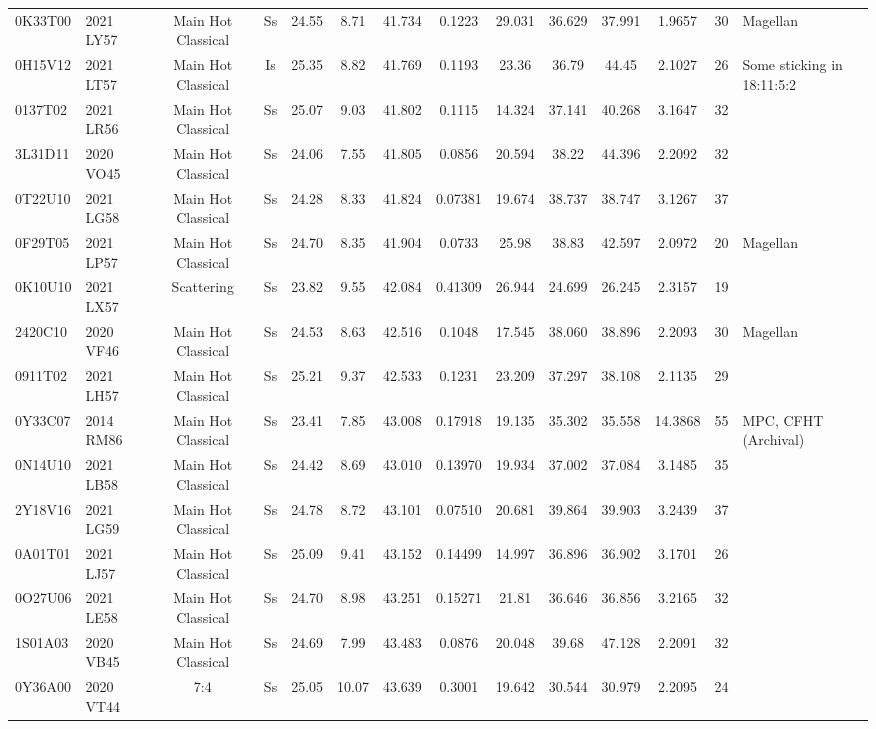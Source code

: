 \begin{longrotatetable}
\begin{longtable}{ll|ccccccccccc | l}
0K33T00 & 2021 LY57 & Main Hot Classical & Ss & 24.55 & 8.71 & 41.734 & 0.1223 & 29.031 & 36.629 & 37.991 & 1.9657 & 30 & Magellan  \\ 
0H15V12 & 2021 LT57 & Main Hot Classical & Is & 25.35 & 8.82 & 41.769 & 0.1193 & 23.36 & 36.79 & 44.45 & 2.1027 & 26 & Some sticking in 18:11:5:2  \\ 
0137T02 & 2021 LR56 & Main Hot Classical & Ss & 25.07 & 9.03 & 41.802 & 0.1115 & 14.324 & 37.141 & 40.268 & 3.1647 & 32 & \\ 
3L31D11 & 2020 VO45 & Main Hot Classical & Ss & 24.06 & 7.55 & 41.805 & 0.0856 & 20.594 & 38.22 & 44.396 & 2.2092 & 32 & \\ 
0T22U10 & 2021 LG58 & Main Hot Classical & Ss & 24.28 & 8.33 & 41.824 & 0.07381 & 19.674 & 38.737 & 38.747 & 3.1267 & 37 & \\ 
0F29T05 & 2021 LP57 & Main Hot Classical & Ss & 24.70 & 8.35 & 41.904 & 0.0733 & 25.98 & 38.83 & 42.597 & 2.0972 & 20 & Magellan  \\ 
0K10U10 & 2021 LX57 & Scattering & Ss & 23.82 & 9.55 & 42.084 & 0.41309 & 26.944 & 24.699 & 26.245 & 2.3157 & 19 & \\ 
2420C10 & 2020 VF46 & Main Hot Classical & Ss & 24.53 & 8.63 & 42.516 & 0.1048 & 17.545 & 38.060 & 38.896 & 2.2093 & 30 & Magellan  \\ 
0911T02 & 2021 LH57 & Main Hot Classical & Ss & 25.21 & 9.37 & 42.533 & 0.1231 & 23.209 & 37.297 & 38.108 & 2.1135 & 29 & \\ 
0Y33C07 & 2014 RM86 & Main Hot Classical & Ss & 23.41 & 7.85 & 43.008 & 0.17918 & 19.135 & 35.302 & 35.558 & 14.3868 & 55 & MPC, CFHT (Archival)  \\ 
0N14U10 & 2021 LB58 & Main Hot Classical & Ss & 24.42 & 8.69 & 43.010 & 0.13970 & 19.934 & 37.002 & 37.084 & 3.1485 & 35 & \\ 
2Y18V16 & 2021 LG59 & Main Hot Classical & Ss & 24.78 & 8.72 & 43.101 & 0.07510 & 20.681 & 39.864 & 39.903 & 3.2439 & 37 & \\ 
0A01T01 & 2021 LJ57 & Main Hot Classical & Ss & 25.09 & 9.41 & 43.152 & 0.14499 & 14.997 & 36.896 & 36.902 & 3.1701 & 26 & \\ 
0O27U06 & 2021 LE58 & Main Hot Classical & Ss & 24.70 & 8.98 & 43.251 & 0.15271 & 21.81 & 36.646 & 36.856 & 3.2165 & 32 & \\ 
1S01A03 & 2020 VB45 & Main Hot Classical & Ss & 24.69 & 7.99 & 43.483 & 0.0876 & 20.048 & 39.68 & 47.128 & 2.2091 & 32 & \\ 
0Y36A00 & 2020 VT44 & 7:4 & Ss & 25.05 & 10.07 & 43.639 & 0.3001 & 19.642 & 30.544 & 30.979 & 2.2095 & 24 & \\ 

\end{longtable}
\end{longrotatetable}
